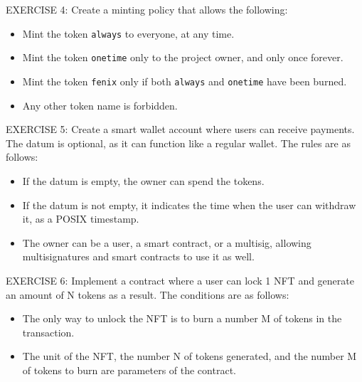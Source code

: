 \begin{remark}
  EXERCISE 4: Create a minting policy that allows the following:
  \begin{itemize}
    \item Mint the token \texttt{always} to everyone, at any time.
    \item Mint the token \texttt{onetime} only to the project owner, and only once forever.
    \item Mint the token \texttt{fenix} only if both \texttt{always} and \texttt{onetime} have been burned.
    \item Any other token name is forbidden.
  \end{itemize}
\end{remark}

\begin{remark}
  EXERCISE 5: Create a smart wallet account where users can receive payments. The datum is optional, as it can function like a regular wallet. The rules are as follows:
  \begin{itemize}
    \item If the datum is empty, the owner can spend the tokens.
    \item If the datum is not empty, it indicates the time when the user can withdraw it, as a POSIX timestamp.
    \item The owner can be a user, a smart contract, or a multisig, allowing multisignatures and smart contracts to use it as well.
  \end{itemize}
\end{remark}

\begin{remark}
  EXERCISE 6: Implement a contract where a user can lock 1 NFT and generate an amount of N tokens as a result. The conditions are as follows:
  \begin{itemize}
    \item The only way to unlock the NFT is to burn a number M of tokens in the transaction.
    \item The unit of the NFT, the number N of tokens generated, and the number M of tokens to burn are parameters of the contract.
  \end{itemize}
\end{remark}
